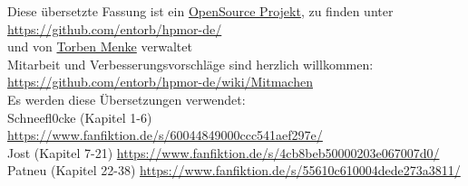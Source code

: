 \newpage
\vspace*{3cm}
\begin{center}
\noindent
Diese übersetzte Fassung ist ein \href{https://github.com/entorb/hpmor-de/}{OpenSource Projekt}, zu finden unter {\small \url{https://github.com/entorb/hpmor-de/}}\\
und von \href{https://entorb.net}{Torben Menke} verwaltet\\
\vspace*{3cm}
Mitarbeit und Verbesserungsvorschläge sind herzlich willkommen:\\
{\small\url{https://github.com/entorb/hpmor-de/wiki/Mitmachen}}\\
\vspace*{3cm}
Es werden diese Übersetzungen verwendet:\\
Schneefl0cke (Kapitel 1-6) {\small \url{https://www.fanfiktion.de/s/60044849000ccc541aef297e/}}\\
Jost (Kapitel 7-21) {\small \url{https://www.fanfiktion.de/s/4cb8beb50000203e067007d0/}}\\
Patneu (Kapitel 22-38) {\small \url{https://www.fanfiktion.de/s/55610c610004dede273a3811/}}\\
\end{center}
